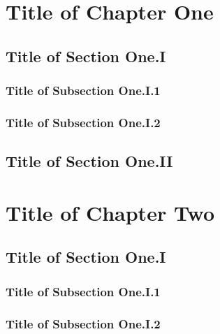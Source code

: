 \documentclass[twoside]{book}
\newcounter{extra}[chapter]  %
\begin{document}
\tableofcontents

\mainmatter%
\chapter{Title of Chapter One}
\lipsum[1]
\section{Title of Section One.I}
\lipsum[1]

\subsection{Title of Subsection One.I.1}
\lipsum[1]


\subsection{Title of Subsection One.I.2}
\lipsum[1]




\section{Title of Section One.II}
\lipsum[1]

\lipsum[1]

\lipsum[1]


\chapter{Title of Chapter Two}
\lipsum[1]
\section{Title of Section One.I}

\lipsum[1]
\subsection{Title of Subsection One.I.1}
\lipsum[1]
\subsection{Title of Subsection One.I.2}
\lipsum[1]

\lipsum[1]


\lipsum[1]


\end{document}
